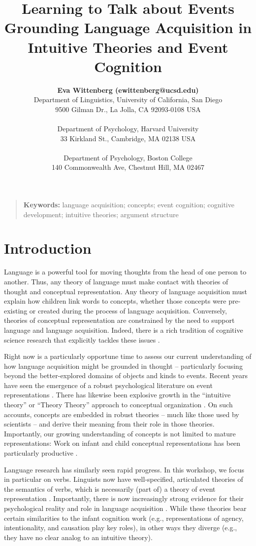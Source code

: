 \documentclass[10pt,letterpaper]{article}
\title{Learning to Talk about Events\\ Grounding Language Acquisition in Intuitive Theories and Event Cognition} %
\author{{\large \bf Eva Wittenberg (ewittenberg@ucsd.edu)} \\
  Department of Linguistics,
  University of California, San Diego \\
  9500 Gilman Dr.,
  La Jolla, CA 92093-0108 USA \\
  \AND {\large \bf Melissa Kline (mekline@mit.edu)} \\
  Department of Psychology,
  Harvard University \\
  33 Kirkland St.,
  Cambridge, MA 02138 USA \\
  \AND {\large \bf Joshua K. Hartshorne (joshua.hartshorne@bc.edu)} \\
  Department of Psychology,
  Boston College \\
  140 Commonwealth Ave,
  Chestnut Hill, MA 02467}
\begin{document}
\maketitle

\begin{quote}
\small
\textbf{Keywords:}
language acquisition; concepts; event cognition; cognitive
development; intuitive theories; argument structure
\end{quote}

\section{Introduction}

Language is a powerful tool for moving thoughts from the
head of one person to another. Thus, any theory of language must make
contact with theories of thought and conceptual representation. Any
theory of language acquisition must explain how children link words to
concepts, whether those concepts were pre-existing or created during
the process of language acquisition. Conversely, theories of
conceptual representation are constrained by the need to support
language and language acquisition. Indeed, there is a rich tradition
of cognitive science research that explicitly tackles these issues \cite{Clark2004,Bowerman1989}.

Right now is a particularly opportune time to assess our
current understanding of how language acquisition might be grounded in
thought -- particularly focusing beyond the better-explored domains of
objects and kinds to events. Recent years have seen the emergence of a
robust psychological literature on event representations \cite{Tversky2013}. There has
likewise been explosive growth in the
``intuitive theory'' or ``Theory Theory'' approach to conceptual organization
\cite{Gopnikinpress,HOT2015,Goodman2011,Battaglia2013}. On such accounts, concepts are
embedded in robust theories -- much like those used by
scientists -- and derive their meaning from their role in those
theories. Importantly, our growing understanding of concepts
is not limited to mature representations: Work on infant and child
conceptual representations has been particularly productive \cite{Gopnikinpress,Ettinger,Henrik2015}.

Language research has similarly seen rapid progress. In this workshop,
we focus in particular on verbs. Linguists now have well-specified,
articulated theories of the semantics of verbs, which is necessarily
(part of) a theory of event representation \cite{Levin2011,Levin2005}. Importantly, there is now increasingly strong evidence for their psychological reality and role in language acquisition
\cite{Ambridge2013,HOSULS}. While these theories bear certain
similarities to the infant cognition work (e.g., representations of
agency, intentionality, and causation play key roles), in other ways
they diverge (e.g., they have no clear analog to an intuitive theory).
\end{document}
